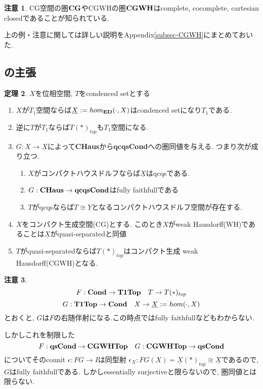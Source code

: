 \documentclass[dvipdfmx,a4paper,11pt]{article}
\theoremstyle{definition}
\newtheorem{thm}{定理}
\newtheorem{rem}[thm]{注意}
\begin{document}
\begin{rem}
CG空間の圏${\bf CG}$やCGWHの圏${\bf CGWH}$はcomplete, cocomplete, cartesian closedであることが知られている. 
\end{rem}

上の例・注意に関しては詳しい説明をAppendix\ref{subsec-CGWH}にまとめておいた. 

\subsection{\cite[Proposition 2.15, Theorem 2.16]{Sch19}の主張}

 \begin{tcolorbox}
 [colback = white, colframe = green!35!black, fonttitle = \bfseries,breakable = true]
\begin{thm}\cite[Proposition 2.15, Theorem 2.16]{Sch19}
\label{thm-Scholze-21516}
$X$を位相空間, $T$をcondenced setとする
\begin{enumerate}
\item $X$が$T_1$空間ならば$\underline{X}:=hom_{{\bf ED}}(\cdot, X)$はcondenced setになり$T_1$である. 
\item 逆に$T$が$T_1$ならば$T(\ast)_{top}$も$T_1$空間になる. 
\item $G : X \to \underline{X}$によって{\bf CHaus}から{\bf qcqsCond}への圏同値を与える. 
つまり次が成り立つ.
\begin{enumerate}
\item $X$がコンパクトハウスドルフならば$\underline{X}$はqcqsである.
\item $G : {\bf CHaus} \to {\bf qcqsCond}$はfully faithfullである
\item $T$がqcqsならば$T \cong \underline{Y}$となるコンパクトハウスドルフ空間が存在する. 
\end{enumerate}
\item $X$をコンパクト生成空間(CG)とする. このとき$X$がweak Hausdorff(WH)であることは$\underline{X}$がquasi-separatedと同値
\item $T$がquasi-separatedならば$T(\ast)_{top}$はコンパクト生成 weak Hausdorff(CGWH)となる.
\end{enumerate}
\end{thm}
 \end{tcolorbox}
 
 \begin{rem}
 $$F: 
 {\bf Cond }\to 
 {\bf T1Top}
 \quad 
 T \to T(\ast)_{top}$$
$$G :  {\bf T1Top} \to {\bf Cond} \quad X \to \underline{X}:=hom(\cdot, X)$$
とおくと, $G$は$F$の右随伴射になる.この時点ではfully faithfullなどもわからない.

しかしこれを制限した
$$
F: {\bf qsCond}
\to {\bf CGWHTop} 
\quad G :  
{\bf CGWHTop} \to{\bf qsCond}
$$
についてそのcounit $\epsilon : FG \to I$は同型射
$\epsilon_{X} : FG(X) = \underline{X}(\ast)_{top} \cong \underline{X}$であるので, $G$はfully faithfullである. しかしessentially surjectiveと限らないので, 圏同値とは限らない.
 \end{rem}
\end{document}
